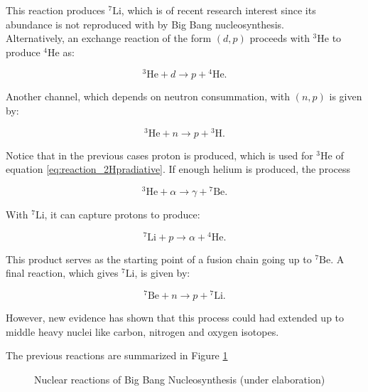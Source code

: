 \documentclass[openany]{book}
\begin{document}
This reaction produces $\mathrm{{}^{7}Li}$, which is of recent research interest since its abundance is not reproduced with by Big Bang nucleosynthesis. \\

Alternatively, an exchange reaction of the form $(d, p)$ proceeds with $\mathrm{{}^{3}He}$ to produce $\mathrm{{}^{4}He}$ as: 

\begin{equation} \label{eq:reaction_3Hed}
	\mathrm{{}^{3}He} + d \rightarrow p  + \mathrm{{}^{4}He}.
	\end{equation}

Another channel, which depends on neutron consummation,  with $(n, p)$ is given by: 

\begin{equation} \label{eq:reaction_3Hen}
	\mathrm{{}^{3}He} + n \rightarrow p  + \mathrm{{}^{3}H}.
\end{equation}

Notice that in the previous cases proton is produced, which is used for $\mathrm{{}^{3}He}$ of equation \ref{eq:reaction_2Hpradiative}. If enough helium is produced, the process 

\begin{equation} \label{eq:reaction_3Healpha}
	\mathrm{{}^{3}He} + \alpha \rightarrow \gamma  + \mathrm{{}^{7}Be}.
\end{equation}

With $\mathrm{{}^{7}Li}$, it can capture protons to produce: 

\begin{equation} \label{eq:reaction_7Lip}
	\mathrm{{}^{7}Li}+ p \rightarrow \alpha  + \mathrm{{}^{4}He}.
\end{equation}

 This product serves as the starting point of a fusion chain going up to $\mathrm{{}^{7}Be}$. A final reaction, which gives $\mathrm{{}^{7}Li}$, is given by: 
 
 \begin{equation} \label{eq:reaction_7Ben}
 	\mathrm{{}^{7}Be} + n \rightarrow p + \mathrm{{}^{7}Li}.
 \end{equation}
 
 However, new evidence has shown that this process could had extended up to middle heavy nuclei like carbon, nitrogen and oxygen isotopes.

The previous reactions are summarized in Figure \ref{fig:nuclearReactionsBNN}

\begin{figure}[H]
	
	\caption[Nuclear reactions of Big Bang Nucleosynthesis]{Nuclear reactions of Big Bang Nucleosynthesis (under elaboration)}
	\label{fig:nuclearReactionsBNN}
\end{figure}
\end{document}
